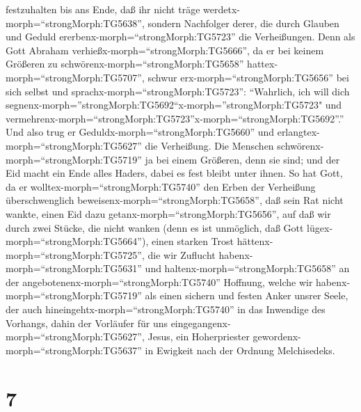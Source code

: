 festzuhalten bis ans Ende,  daß ihr nicht träge
werdetx-morph=``strongMorph:TG5638'', sondern Nachfolger derer, die
durch Glauben und Geduld ererbenx-morph=``strongMorph:TG5723'' die
Verheißungen.  Denn als Gott Abraham
verhießx-morph=``strongMorph:TG5666'', da er bei keinem Größeren zu
schwörenx-morph=``strongMorph:TG5658''
hattex-morph=``strongMorph:TG5707'', schwur
erx-morph=``strongMorph:TG5656'' bei sich selbst  und
sprachx-morph=``strongMorph:TG5723'': ``Wahrlich, ich will dich
segnenx-morph=''strongMorph:TG5692``x-morph=''strongMorph:TG5723" und
vermehrenx-morph=``strongMorph:TG5723''x-morph=``strongMorph:TG5692''.''
 Und also trug er Geduldx-morph=``strongMorph:TG5660'' und
erlangtex-morph=``strongMorph:TG5627'' die Verheißung.  Die
Menschen schwörenx-morph=``strongMorph:TG5719'' ja bei einem Größeren,
denn sie sind; und der Eid macht ein Ende alles Haders, dabei es fest
bleibt unter ihnen.  So hat Gott, da er
wolltex-morph=``strongMorph:TG5740'' den Erben der Verheißung
überschwenglich beweisenx-morph=``strongMorph:TG5658'', daß sein Rat
nicht wankte, einen Eid dazu getanx-morph=``strongMorph:TG5656'',
 auf daß wir durch zwei Stücke, die nicht wanken (denn es
ist unmöglich, daß Gott lügex-morph=``strongMorph:TG5664''), einen
starken Trost hättenx-morph=``strongMorph:TG5725'', die wir Zuflucht
habenx-morph=``strongMorph:TG5631'' und
haltenx-morph=``strongMorph:TG5658'' an der
angebotenenx-morph=``strongMorph:TG5740'' Hoffnung,  welche
wir habenx-morph=``strongMorph:TG5719'' als einen sichern und festen
Anker unsrer Seele, der auch hineingehtx-morph=``strongMorph:TG5740'' in
das Inwendige des Vorhangs,  dahin der Vorläufer für uns
eingegangenx-morph=``strongMorph:TG5627'', Jesus, ein Hoherpriester
gewordenx-morph=``strongMorph:TG5637'' in Ewigkeit nach der Ordnung
Melchisedeks.

\hypertarget{section-6}{%
\section{7}\label{section-6}}

